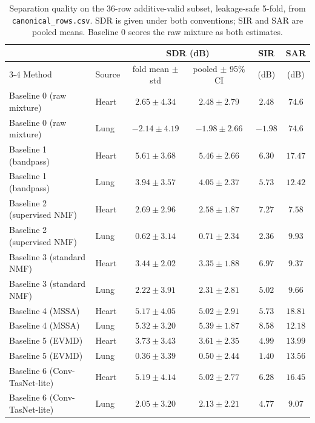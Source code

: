 \documentclass[11pt]{article}
\begin{document}
\begin{table}[H]
\centering
\caption{Separation quality on the 36-row additive-valid subset, leakage-safe 5-fold, from \texttt{canonical\_rows.csv}. SDR is given under both conventions; SIR and SAR are pooled means. Baseline 0 scores the raw mixture as both estimates.}
\label{tab:baselinevalid}
\label{tab:pooledvalid}
\label{tab:sixmethodnative}
\small
\begin{tabular}{@{}llcccc@{}}
\toprule
 & & \multicolumn{2}{c}{SDR (dB)} & SIR & SAR \\
\cmidrule(lr){3-4}
Method & Source & fold mean $\pm$ std & pooled $\pm$ 95\% CI & (dB) & (dB) \\
\midrule
Baseline 0 (raw mixture) & Heart & $2.65 \pm 4.34$ & $2.48 \pm 2.79$ & $2.48$ & $74.6$ \\
Baseline 0 (raw mixture) & Lung & $-2.14 \pm 4.19$ & $-1.98 \pm 2.66$ & $-1.98$ & $74.6$ \\
\addlinespace
Baseline 1 (bandpass) & Heart & $5.61 \pm 3.68$ & $5.46 \pm 2.66$ & $6.30$ & $17.47$ \\
Baseline 1 (bandpass) & Lung & $3.94 \pm 3.57$ & $4.05 \pm 2.37$ & $5.73$ & $12.42$ \\
\addlinespace
Baseline 2 (supervised NMF) & Heart & $2.69 \pm 2.96$ & $2.58 \pm 1.87$ & $7.27$ & $7.58$ \\
Baseline 2 (supervised NMF) & Lung & $0.62 \pm 3.14$ & $0.71 \pm 2.34$ & $2.36$ & $9.93$ \\
\addlinespace
Baseline 3 (standard NMF) & Heart & $3.44 \pm 2.02$ & $3.35 \pm 1.88$ & $6.97$ & $9.37$ \\
Baseline 3 (standard NMF) & Lung & $2.22 \pm 3.91$ & $2.31 \pm 2.81$ & $5.02$ & $9.66$ \\
\addlinespace
Baseline 4 (MSSA) & Heart & $5.17 \pm 4.05$ & $5.02 \pm 2.91$ & $5.73$ & $18.81$ \\
Baseline 4 (MSSA) & Lung & $5.32 \pm 3.20$ & $5.39 \pm 1.87$ & $8.58$ & $12.18$ \\
\addlinespace
Baseline 5 (EVMD) & Heart & $3.73 \pm 3.43$ & $3.61 \pm 2.35$ & $4.99$ & $13.99$ \\
Baseline 5 (EVMD) & Lung & $0.36 \pm 3.39$ & $0.50 \pm 2.44$ & $1.40$ & $13.56$ \\
\addlinespace
Baseline 6 (Conv-TasNet-lite) & Heart & $5.19 \pm 4.14$ & $5.02 \pm 2.77$ & $6.28$ & $16.45$ \\
Baseline 6 (Conv-TasNet-lite) & Lung & $2.05 \pm 3.20$ & $2.13 \pm 2.21$ & $4.77$ & $9.07$ \\
\bottomrule
\end{tabular}
\end{table}
\end{document}
